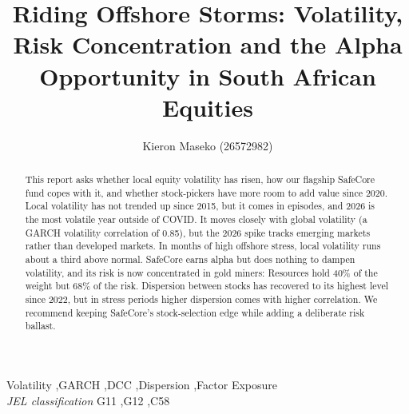 \documentclass[11pt,preprint]{elsarticle}
\numberwithin{equation}{section}
\numberwithin{figure}{section}
\numberwithin{table}{section}
\begin{document}
\begin{frontmatter}  %

\title{Riding Offshore Storms: Volatility, Risk Concentration and the
Alpha Opportunity in South African Equities}





\author[Add1]{Kieron Maseko (26572982)}





\address[Add1]{Stellenbosch University, Stellenbosch, South Africa}


\begin{abstract}
\small{
This report asks whether local equity volatility has risen, how our
flagship SafeCore fund copes with it, and whether stock-pickers have
more room to add value since 2020. Local volatility has not trended up
since 2015, but it comes in episodes, and 2026 is the most volatile year
outside of COVID. It moves closely with global volatility (a GARCH
volatility correlation of 0.85), but the 2026 spike tracks emerging
markets rather than developed markets. In months of high offshore
stress, local volatility runs about a third above normal. SafeCore earns
alpha but does nothing to dampen volatility, and its risk is now
concentrated in gold miners: Resources hold 40\% of the weight but 68\%
of the risk. Dispersion between stocks has recovered to its highest
level since 2022, but in stress periods higher dispersion comes with
higher correlation. We recommend keeping SafeCore's stock-selection edge
while adding a deliberate risk ballast.
}
\end{abstract}

\vspace{1cm}


\begin{keyword}
\footnotesize{
Volatility \sep GARCH \sep DCC \sep Dispersion \sep Factor Exposure \\
\vspace{0.3cm}
}
\footnotesize{
\textit{JEL classification} G11 \sep G12 \sep C58
}
\end{keyword}



\vspace{0.5cm}

\end{frontmatter}
\end{document}
